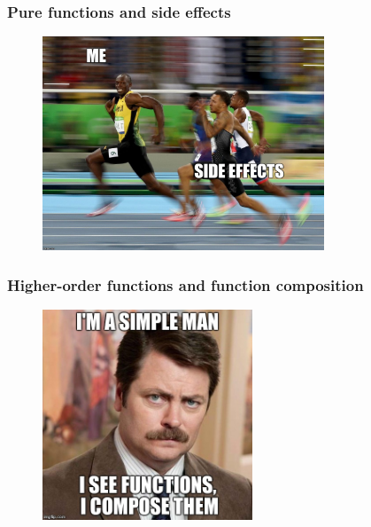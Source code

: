 \documentclass[18pt, compress, aspectratio=169]{beamer}
\begin{document}
\begin{frame}
    \frametitle{Pure functions and side effects}
    \vspace{-30pt}
    \begin{figure}
        \includegraphics[width=0.75\textwidth,center]{side_effect.jpg}
    \end{figure}
\end{frame}

\begin{frame}
    \frametitle{Higher-order functions and function composition}
    \vspace{-30pt}
    \begin{figure}
        \includegraphics[width=0.56\textwidth,center]{function_composition.jpg}
    \end{figure}
\end{frame}
\end{document}
